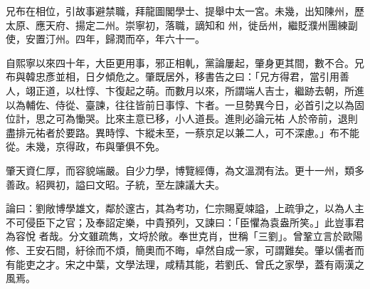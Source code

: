 \begin{pinyinscope}
 兄布在相位，引故事避禁職，拜龍圖閣學士、提舉中太一宮。未幾，出知陳州，歷太原、應天府、揚定二州。崇寧初，落職，謫知和
 州，徙岳州，繼貶濮州團練副使，安置汀州。四年，歸潤而卒，年六十一。



 自熙寧以來四十年，大臣更用事，邪正相軋，黨論屢起，肇身更其間，數不合。兄布與韓忠彥並相，日夕傾危之。肇既居外，移書告之曰：「兄方得君，當引用善人，翊正道，以杜惇、卞復起之萌。而數月以來，所謂端人吉士，繼跡去朝，所進以為輔佐、侍從、臺諫，往往皆前日事惇、卞者。一旦勢異今日，必首引之以為固位計，思之可為慟哭。比來主意已移，小人道長。進則必論元祐
 人於帝前，退則盡排元祐者於要路。異時惇、卞縱未至，一蔡京足以兼二人，可不深慮。」布不能從。未幾，京得政，布與肇俱不免。



 肇天資仁厚，而容貌端嚴。自少力學，博覽經傳，為文溫潤有法。更十一州，類多善政。紹興初，謚曰文昭。子統，至左諫議大夫。



 論曰：劉敞博學雄文，鄰於邃古，其為考功，仁宗賜夏竦謚，上疏爭之，以為人主不可侵臣下之官；及奉詔定樂，中貴預列，又諫曰：「臣懼為袁盎所笑。」此豈事君為容悅
 者哉。分文雖疏雋，文埒於敞。奉世克肖，世稱「三劉」。曾鞏立言於歐陽修、王安石間，紆徐而不煩，簡奧而不晦，卓然自成一家，可謂難矣。肇以儒者而有能吏之才。宋之中葉，文學法理，咸精其能，若劉氏、曾氏之家學，蓋有兩漢之風焉。



\end{pinyinscope}